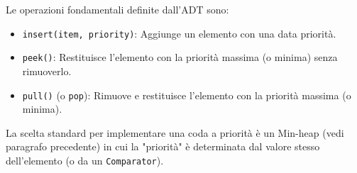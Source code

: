 \medskip

Le operazioni fondamentali definite dall'ADT sono:
\begin{itemize}
    \item \texttt{insert(item, priority)}: Aggiunge un elemento con una data priorità.
    \item \texttt{peek()}: Restituisce l'elemento con la priorità massima (o minima) senza rimuoverlo.
    \item \texttt{pull()} (o \texttt{pop}): Rimuove e restituisce l'elemento con la priorità massima (o minima).
\end{itemize}

\medskip

La scelta standard per implementare una coda a priorità è un Min-heap (vedi paragrafo precedente) in cui la "priorità" è determinata dal valore stesso dell'elemento (o da un \texttt{Comparator}).

